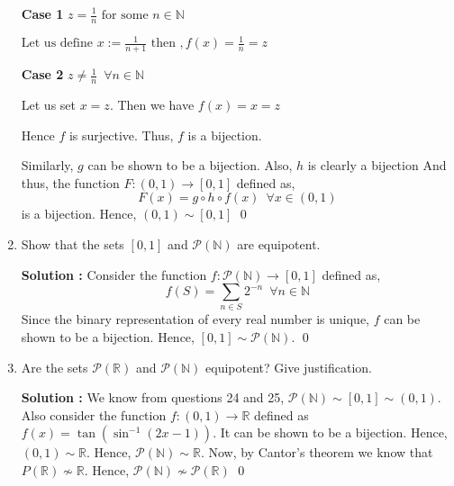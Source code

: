 \documentclass[10pt]{article}
\newcommand{\nn}{\mathbb{N}}
\newcommand{\rn}{\mathbb{R}}
\newcommand{\p}{\mathcal{P}}
\begin{document}
\begin{enumerate}
    \textbf{Case 1} $z = \frac{1}{n} \text{ for some } n \in \nn$

        $\text{Let us define }x := \frac{1}{n + 1} \text{ then }, f(x) = \frac{1}{n} = z$

    \textbf{Case 2} $z \neq \frac{1}{n} \,\,\,\forall n \in \nn$

        Let us set $x = z$. Then we have $f(x) = x = z$

    Hence $f$ is surjective. Thus, $f$ is a bijection.
    
    Similarly, $g$ can be shown to be a bijection. Also, $h$ is clearly a bijection And thus, the function $F : (0, 1) \to [0, 1]$ defined as, $$F(x) = g\circ h\circ f(x) \, \, \, \forall x \in (0,1)$$ is a bijection. Hence, $(0,1) \sim [0, 1]$ \qed
    \item Show that the sets $[0, 1]$ and $\p(\nn)$ are equipotent.

	    \textbf{Solution : }Consider the function $f:\p(\nn) \to [0,1]$ defined as,
	    $$f(S) = \sum_{n \in S} 2^{-n} \,\,\, \forall n \in \nn$$
	    Since the binary representation of every real number is unique, 
	    $f$ can be shown to be a bijection. Hence, $[0,1] \sim \p(\nn)$. \qed


	    
    \item Are the sets $\p(\rn)$ and $\p(\nn)$ equipotent? Give justification. 

    \textbf{Solution : }We know from questions 24 and 25, $\p(\nn) \sim [0, 1] \sim (0, 1)$.
    Also consider the function $f : (0, 1) \to \rn$ defined as $f(x) = \tan(\sin^{-1}(2x - 1))$. It can be shown to be a bijection. Hence, $(0, 1) \sim \rn$. Hence, $\p(\nn) \sim \rn$. Now, by Cantor's theorem we know that $P(\rn) \not \sim \rn$. Hence, $\p(\nn) \not\sim \p(\rn)$ \qed
\end{enumerate}
\end{document}
